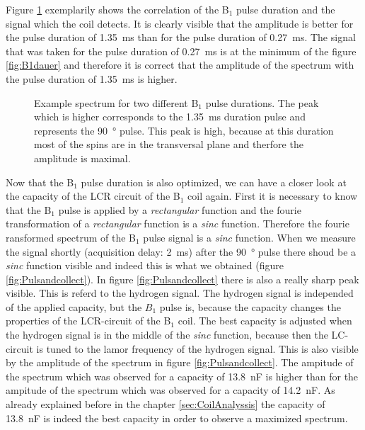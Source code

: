 Figure \ref{fig:pulsedurationbeispiel} exemplarily shows the correlation of the B$_1$ pulse duration and the signal which the coil detects. It is clearly visible that the amplitude is better for the pulse duration of \SI{1.35}{\milli \second} than for the pulse duration of \SI{0.27}{\milli \second}. The signal that was taken for the pulse duration of \SI{0.27}{\milli \second} is at the minimum of the figure \ref{fig:B1dauer} and therefore it is correct that the amplitude of the spectrum with the pulse duration of \SI{1.35}{\milli \second} is higher.
\begin{figure}[H]
    \centering
    
    \caption[Example spectrum for two different B$_1$ pulse durations.]{Example spectrum for two different B$_1$ pulse durations. The peak which is higher corresponds to the \SI{1.35}{\milli \second} duration pulse and represents the \SI{90}{\degree} pulse. This peak is high, because at this duration most of the spins are in the transversal plane and therfore the amplitude is maximal.}
    \label{fig:pulsedurationbeispiel}
\end{figure}
Now that the B$_1$ pulse duration is also optimized, we can have a closer look at the capacity of the LCR circuit of the B$_1$ coil again. First it is necessary to know that the B$_1$ pulse is applied by a \textit{rectangular} function and the fourie transformation of a \textit{rectangular} function is a \textit{sinc} function. Therefore the fourie ransformed spectrum of the B$_1$ pulse signal is a \textit{sinc} function. When we measure the signal shortly (acquisition delay: \SI{2}{\milli \second}) after the \SI{90}{\degree} pulse there shoud be a \textit{sinc} function visible and indeed this is what we obtained (figure \ref{fig:Pulsandcollect}). In figure \ref{fig:Pulsandcollect} there is also a really sharp peak visible. This is referd to the hydrogen signal. The hydrogen signal is independed of the applied capacity, but the $B_1$ pulse is, because the capacity changes the properties of the LCR-circuit of the B$_1$ coil. The best capacity is adjusted when the hydrogen signal is in the middle of the \textit{sinc} function, because then the LC- circuit is tuned to the lamor frequency of the hydrogen signal. This is also visible by the amplitude of the spectrum in figure \ref{fig:Pulsandcollect}. The ampitude of the spectrum which was observed for a capacity of \SI{13.8}{\nano \farad} is higher than for the ampitude of the spectrum which was observed for a capacity of \SI{14.2}{\nano \farad}. As already explained before in the chapter \ref{sec:CoilAnalyssis} the capacity of \SI{13.8}{\nano \farad} is indeed the best capacity in order to observe a maximized spectrum.
